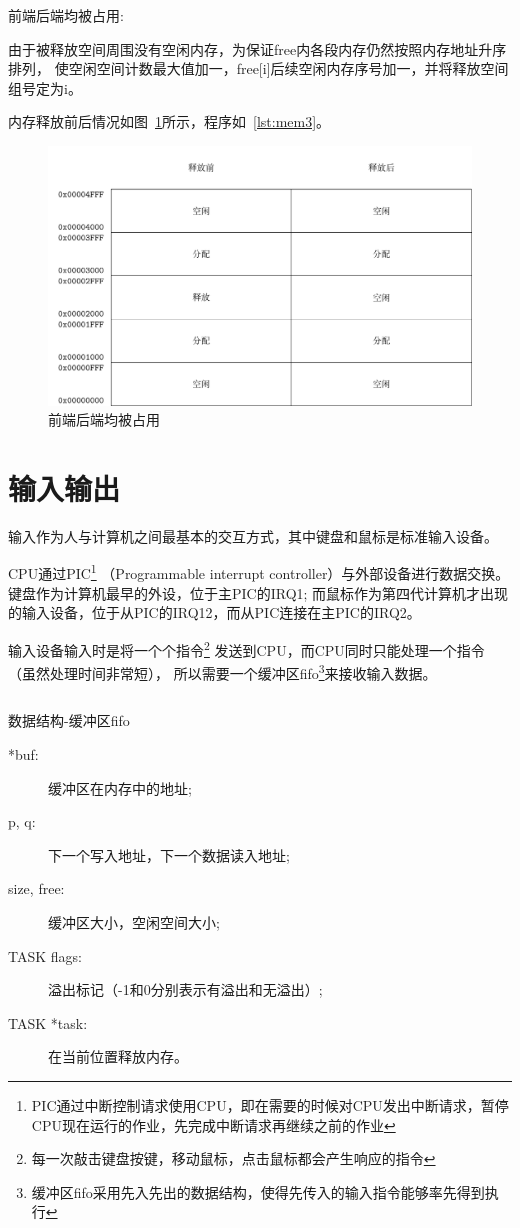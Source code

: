 
前端后端均被占用:

由于被释放空间周围没有空闲内存，为保证free内各段内存仍然按照内存地址升序排列，
使空闲空间计数最大值加一，free[i]后续空闲内存序号加一，并将释放空间组号定为i。

内存释放前后情况如图~\ref{fig:mem3}所示，程序如~\ref{lst:mem3}。
\begin{figure}[h]
  \centering
  \includegraphics[width=.7\textwidth]{fig/mem3.pdf}
  \caption{前端后端均被占用}
  \label{fig:mem3}
\end{figure}

\section{输入输出}

输入作为人与计算机之间最基本的交互方式，其中键盘和鼠标是标准输入设备。

CPU通过PIC\footnote{PIC通过中断控制请求使用CPU，即在需要的时候对CPU发出中断请求，暂停CPU现在运行的作业，先完成中断请求再继续之前的作业}
（Programmable interrupt controller）与外部设备进行数据交换。
键盘作为计算机最早的外设，位于主PIC的IRQ1;
而鼠标作为第四代计算机才出现的输入设备，位于从PIC的IRQ12，而从PIC连接在主PIC的IRQ2。

输入设备输入时是将一个个指令\footnote{每一次敲击键盘按键，移动鼠标，点击鼠标都会产生响应的指令}
发送到CPU，而CPU同时只能处理一个指令（虽然处理时间非常短），
所以需要一个缓冲区fifo\footnote{缓冲区fifo采用先入先出的数据结构，使得先传入的输入指令能够率先得到执行}来接收输入数据。

\begin{listing}[H]
  \inputminted[tabsize=2, firstline=40, lastline=44,
  linenos=true]{c}{../ZOS/src/kernel/bootpack.h}
  \caption{数据结构-缓冲区fifo}
  \label{lst:fifo}
\end{listing}
\begin{description}
\item[*buf:]缓冲区在内存中的地址;
\item[p, q:]下一个写入地址，下一个数据读入地址;
\item[size, free:]缓冲区大小，空闲空间大小;
\item[TASK flags:]溢出标记（-1和0分别表示有溢出和无溢出）;
\item[TASK *task:]在当前位置释放内存。
\end{description}

